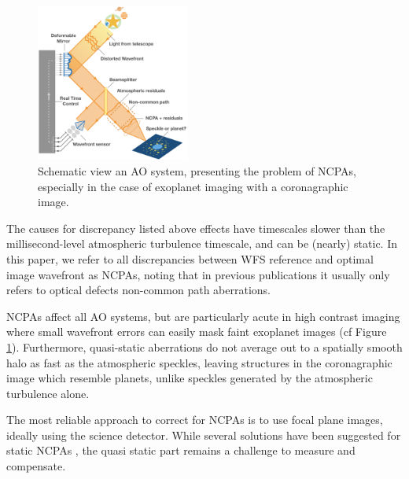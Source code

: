 \documentclass[twocolumn]{aa}
\newcommand{\anthony}[1]{\textcolor{magenta}{#1}}
\begin{document}
\begin{figure}[t]
\centering
\includegraphics[width=0.45\textwidth]{fig/AO_schema.png}
\caption{Schematic view an AO system, presenting the problem of NCPAs, especially in the case of exoplanet imaging with a coronagraphic image.}
\label{fig:AO_schema}
\end{figure}



The causes for discrepancy listed above effects have timescales slower than the millisecond-level atmospheric turbulence timescale, and can be (nearly) static. 
In this paper, we refer to all discrepancies between WFS reference and optimal image wavefront as NCPAs, noting that in previous publications it usually only refers to optical defects non-common path aberrations.

 
NCPAs affect all AO systems, but are particularly acute in high contrast imaging where small wavefront errors can easily mask faint exoplanet images (cf Figure \ref{fig:AO_schema}). Furthermore, quasi-static aberrations do not average out to a spatially smooth halo as fast as the atmospheric speckles, leaving structures in the coronagraphic image which resemble planets, unlike speckles generated by the atmospheric turbulence alone.


The most reliable approach to correct for NCPAs is to use focal plane images, ideally using the science detector. 
While several solutions have been suggested for static NCPAs \citep{vievardLAPD, Frazin2018,Vigan2018NCPA, BosFF2020, Potier2020darkhole}, the quasi static part remains a challenge to measure and compensate. 
\end{document}
